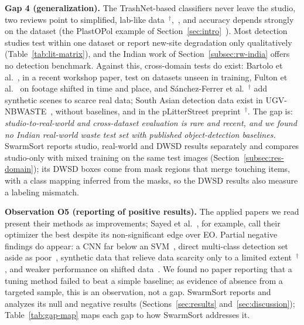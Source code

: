 \textbf{Gap 4 (generalization).} The TrashNet-based classifiers never leave the studio, two reviews point to simplified, lab-like data~\cite{lu2022computer}$^{\dagger}$,~\cite{fang2023artificial}, and accuracy depends strongly on the dataset (the PlastOPol example of Section~\ref{sec:intro}~\cite{cordova2022litter}). Most detection studies test within one dataset or report new-site degradation only qualitatively (Table~\ref{tab:lit-matrix}), and the Indian work of Section~\ref{subsec:rw-india} offers no detection benchmark. Against this, cross-domain tests do exist: Bartolo et al.~\cite{bartolo2025learning}, in a recent workshop paper, test on datasets unseen in training, Fulton et al.~\cite{fulton2019robotic} on footage shifted in time and place, and S\'{a}nchez-Ferrer et al.~\cite{sanchezferrer2023experimental}$^{\dagger}$ add synthetic scenes to scarce real data; South Asian detection data exist in UGV-NBWASTE~\cite{isalm2025ugvnbwaste}, without baselines, and in the pLitterStreet preprint~\cite{mandhati2024plitterstreet}$^{\dagger}$. The gap is: \emph{studio-to-real-world and cross-dataset evaluation is rare and recent, and we found no Indian real-world waste test set with published object-detection baselines.} SwarmSort reports studio, real-world and DWSD results separately and compares studio-only with mixed training on the same test images (Section~\ref{subsec:res-domain}); its DWSD boxes come from mask regions that merge touching items, with a class mapping inferred from the masks, so the DWSD results also measure a labeling mismatch.

\textbf{Observation O5 (reporting of positive results).} The applied papers we read present their methods as improvements; Sayed et al.~\cite{sayed2024intelligent}, for example, call their optimizer the best despite its non-significant edge over EO. Partial negative findings do appear: a CNN far below an SVM~\cite{yang2016classification}, direct multi-class detection set aside as poor~\cite{majchrowska2022deep}, synthetic data that relieve data scarcity only to a limited extent~\cite{sanchezferrer2023experimental}$^{\dagger}$, and weaker performance on shifted data~\cite{fulton2019robotic,liao2022realtime}. We found no paper reporting that a tuning method failed to beat a simple baseline; as evidence of absence from a targeted sample, this is an observation, not a gap. SwarmSort reports and analyzes its null and negative results (Sections~\ref{sec:results} and~\ref{sec:discussion}); Table~\ref{tab:gap-map} maps each gap to how SwarmSort addresses it.

